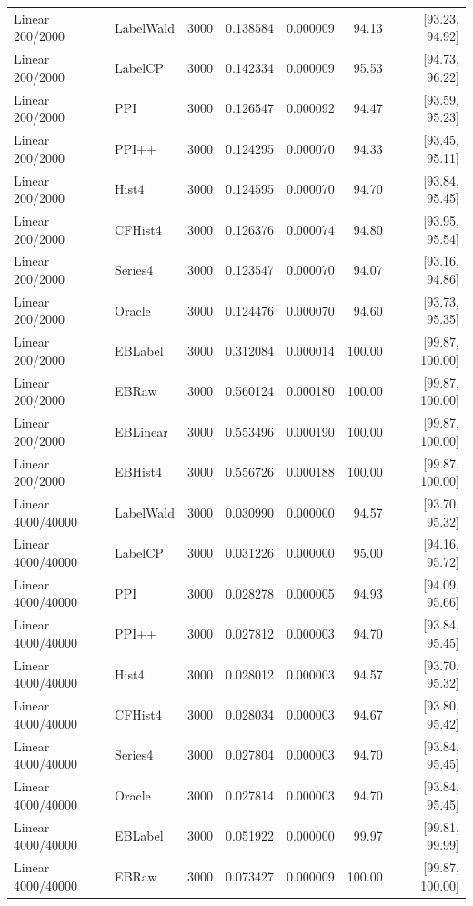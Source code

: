 \begin{longtable}{llrrrrr}
Linear 200/2000 & LabelWald & 3000 & 0.138584 & 0.000009 & 94.13 & [93.23, 94.92]\\
Linear 200/2000 & LabelCP & 3000 & 0.142334 & 0.000009 & 95.53 & [94.73, 96.22]\\
Linear 200/2000 & PPI & 3000 & 0.126547 & 0.000092 & 94.47 & [93.59, 95.23]\\
Linear 200/2000 & PPI++ & 3000 & 0.124295 & 0.000070 & 94.33 & [93.45, 95.11]\\
Linear 200/2000 & Hist4 & 3000 & 0.124595 & 0.000070 & 94.70 & [93.84, 95.45]\\
Linear 200/2000 & CFHist4 & 3000 & 0.126376 & 0.000074 & 94.80 & [93.95, 95.54]\\
Linear 200/2000 & Series4 & 3000 & 0.123547 & 0.000070 & 94.07 & [93.16, 94.86]\\
Linear 200/2000 & Oracle & 3000 & 0.124476 & 0.000070 & 94.60 & [93.73, 95.35]\\
Linear 200/2000 & EBLabel & 3000 & 0.312084 & 0.000014 & 100.00 & [99.87, 100.00]\\
Linear 200/2000 & EBRaw & 3000 & 0.560124 & 0.000180 & 100.00 & [99.87, 100.00]\\
Linear 200/2000 & EBLinear & 3000 & 0.553496 & 0.000190 & 100.00 & [99.87, 100.00]\\
Linear 200/2000 & EBHist4 & 3000 & 0.556726 & 0.000188 & 100.00 & [99.87, 100.00]\\
Linear 4000/40000 & LabelWald & 3000 & 0.030990 & 0.000000 & 94.57 & [93.70, 95.32]\\
Linear 4000/40000 & LabelCP & 3000 & 0.031226 & 0.000000 & 95.00 & [94.16, 95.72]\\
Linear 4000/40000 & PPI & 3000 & 0.028278 & 0.000005 & 94.93 & [94.09, 95.66]\\
Linear 4000/40000 & PPI++ & 3000 & 0.027812 & 0.000003 & 94.70 & [93.84, 95.45]\\
Linear 4000/40000 & Hist4 & 3000 & 0.028012 & 0.000003 & 94.57 & [93.70, 95.32]\\
Linear 4000/40000 & CFHist4 & 3000 & 0.028034 & 0.000003 & 94.67 & [93.80, 95.42]\\
Linear 4000/40000 & Series4 & 3000 & 0.027804 & 0.000003 & 94.70 & [93.84, 95.45]\\
Linear 4000/40000 & Oracle & 3000 & 0.027814 & 0.000003 & 94.70 & [93.84, 95.45]\\
Linear 4000/40000 & EBLabel & 3000 & 0.051922 & 0.000000 & 99.97 & [99.81, 99.99]\\
Linear 4000/40000 & EBRaw & 3000 & 0.073427 & 0.000009 & 100.00 & [99.87, 100.00]\\

\end{longtable}
